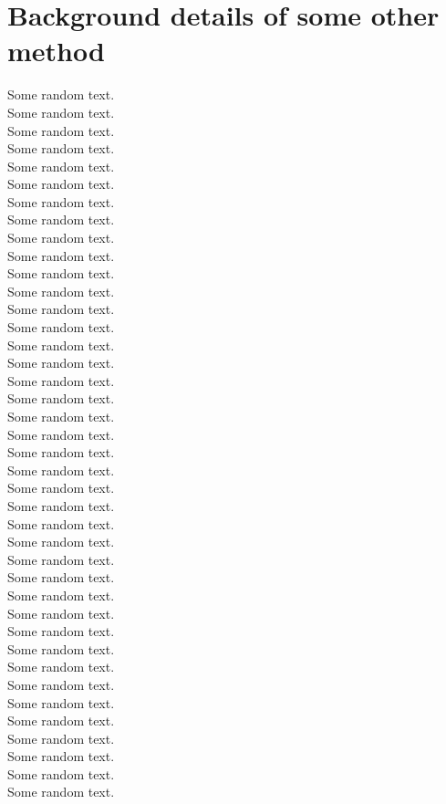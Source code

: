 \chapter{Background details of some other method}


Some random text.\\
Some random text.\\
Some random text.\\
Some random text.\\
Some random text.\\
Some random text.\\
Some random text.\\
Some random text.\\
Some random text.\\
Some random text.\\
Some random text.\\
Some random text.\\
Some random text.\\
Some random text.\\
Some random text.\\
Some random text.\\
Some random text.\\
Some random text.\\
Some random text.\\
Some random text.\\
Some random text.\\
Some random text.\\
Some random text.\\
Some random text.\\
Some random text.\\
Some random text.\\
Some random text.\\
Some random text.\\
Some random text.\\
Some random text.\\
Some random text.\\
Some random text.\\
Some random text.\\
Some random text.\\
Some random text.\\
Some random text.\\
Some random text.\\
Some random text.\\
Some random text.\\
Some random text.\\
